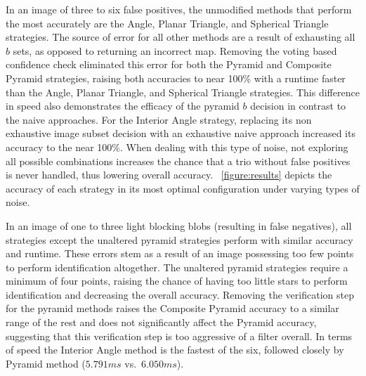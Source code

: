 
In an image of three to six false positives, the unmodified methods that perform the most accurately are the Angle, Planar Triangle, and Spherical Triangle strategies.
The source of error for all other methods are a result of exhausting all $b$ sets, as opposed to returning an incorrect map.
Removing the voting based confidence check eliminated this error for both the Pyramid and Composite Pyramid strategies, raising both accuracies to near 100\% with a runtime faster than the Angle, Planar Triangle, and Spherical Triangle strategies.
This difference in speed also demonstrates the efficacy of the pyramid $b$ decision in contrast to the naive approaches.
For the Interior Angle strategy, replacing its non exhaustive image subset decision with an exhaustive naive approach increased its accuracy to the near 100\%.
When dealing with this type of noise, not exploring all possible combinations increases the chance that a trio without false positives is never handled, thus lowering overall accuracy.
~\autoref{figure:results} depicts the accuracy of each strategy in its most optimal configuration under varying types of noise.

In an image of one to three light blocking blobs (resulting in false negatives), all strategies except the unaltered pyramid strategies perform with similar accuracy and runtime.
These errors stem as a result of an image possessing too few points to perform identification altogether.
The unaltered pyramid strategies require a minimum of four points, raising the chance of having too little stars to perform identification and decreasing the overall accuracy.
Removing the verification step for the pyramid methods raises the Composite Pyramid accuracy to a similar range of the rest and does not significantly affect the Pyramid accuracy, suggesting that this verification step is too aggressive of a filter overall.
In terms of speed the Interior Angle method is the fastest of the six, followed closely by Pyramid method ($5.791\si{ms}$ vs.\ $6.050\si{ms}$).


